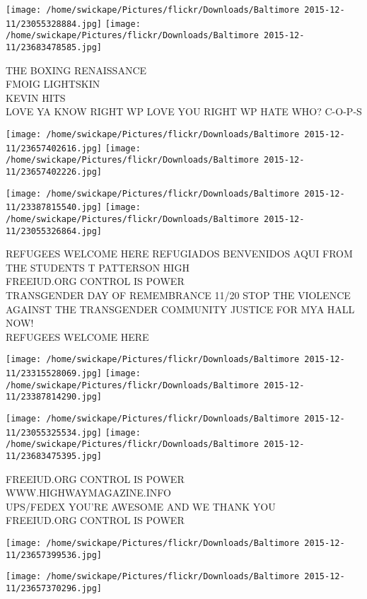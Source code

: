 \documentclass[10pt,letterpaper]{article}
\begin{document}
\texttt{[image: /home/swickape/Pictures/flickr/Downloads/Baltimore 2015-12-11/23055328884.jpg]}
\texttt{[image: /home/swickape/Pictures/flickr/Downloads/Baltimore 2015-12-11/23683478585.jpg]}

THE BOXING RENAISSANCE\\
FMOIG LIGHTSKIN\\
KEVIN HITS\\
LOVE YA KNOW RIGHT WP LOVE YOU RIGHT WP HATE WHO? C{-}O{-}P{-}S
\pagebreak

\texttt{[image: /home/swickape/Pictures/flickr/Downloads/Baltimore 2015-12-11/23657402616.jpg]}
\texttt{[image: /home/swickape/Pictures/flickr/Downloads/Baltimore 2015-12-11/23657402226.jpg]}

\texttt{[image: /home/swickape/Pictures/flickr/Downloads/Baltimore 2015-12-11/23387815540.jpg]}
\texttt{[image: /home/swickape/Pictures/flickr/Downloads/Baltimore 2015-12-11/23055326864.jpg]}

REFUGEES WELCOME HERE REFUGIADOS BENVENIDOS AQUI FROM THE STUDENTS T PATTERSON HIGH\\
FREEIUD.ORG CONTROL IS POWER\\
TRANSGENDER DAY OF REMEMBRANCE 11/20 STOP THE VIOLENCE AGAINST THE TRANSGENDER COMMUNITY JUSTICE FOR MYA HALL NOW!\\
REFUGEES WELCOME HERE
\pagebreak

\texttt{[image: /home/swickape/Pictures/flickr/Downloads/Baltimore 2015-12-11/23315528069.jpg]}
\texttt{[image: /home/swickape/Pictures/flickr/Downloads/Baltimore 2015-12-11/23387814290.jpg]}

\texttt{[image: /home/swickape/Pictures/flickr/Downloads/Baltimore 2015-12-11/23055325534.jpg]}
\texttt{[image: /home/swickape/Pictures/flickr/Downloads/Baltimore 2015-12-11/23683475395.jpg]}

FREEIUD.ORG CONTROL IS POWER\\
WWW.HIGHWAYMAGAZINE.INFO\\
UPS/FEDEX YOU'RE AWESOME AND WE THANK YOU\\
FREEIUD.ORG CONTROL IS POWER
\pagebreak

\texttt{[image: /home/swickape/Pictures/flickr/Downloads/Baltimore 2015-12-11/23657399536.jpg]}

\vspace{0.25in}
\texttt{[image: /home/swickape/Pictures/flickr/Downloads/Baltimore 2015-12-11/23657370296.jpg]}
\end{document}
